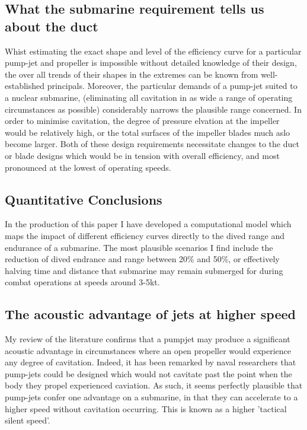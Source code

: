 \documentclass{article}\usepackage[]{graphicx}\usepackage[]{color}
\begin{document}
\subsection{What the submarine requirement tells us about the duct}

Whist estimating the exact shape and level of the efficiency curve for a particular pump-jet and propeller is impossible without detailed knowledge of their design, the over all trends of their shapes in the extremes can be known from well-established principals.  Moreover, the particular demands of a pump-jet suited to a nuclear submarine, (eliminating all cavitation in as wide a range of operating circumstances as possible) considerably narrows the plausible range concerned.  In order to minimise cavitation, the degree of pressure elvation at the impeller would be relatively high, or the total surfaces of the impeller blades much aslo become larger.  Both of these design requirements necessitate changes to the duct or blade designs which would be in tension with overall efficiency, and most pronounced at the lowest of operating speeds.

\subsection{Quantitative Conclusions}

In the production of this paper I have developed a computational model which maps the impact of different efficiency curves directly to the dived range and endurance of a submarine. The most plausible scenarios I find include the reduction of dived endrance and range between 20\% and 50\%, or effectively halving time and distance that submarine may remain submerged for during combat operations at speeds around 3-5kt.

\subsection{The acoustic advantage of jets at higher speed}

My review of the literature confirms that a pumpjet may produce a significant acoustic advantage in circumstances where an open propeller would experience any degree of cavitation. Indeed, it has been remarked by naval researchers that pump-jets could be designed which would not cavitate past the point when the body they propel experienced caviation.   As such, it seems perfectly plausible that pump-jets confer one advantage on a submarine, in that they can accelerate to a higher speed without cavitation occurring.  This is known as a higher 'tactical silent speed'.
\end{document}
